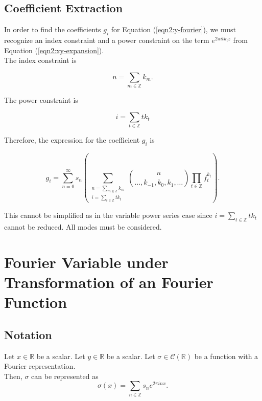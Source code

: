 \documentclass{article}
\begin{document}
    \subsection{Coefficient Extraction}

    In order to find the coefficients $g_i$ for Equation (\ref{eqn2:y-fourier}), we must recognize an index constraint and a power constraint on the term $e^{2\pi i t k_t z}$ from Equation (\ref{eqn2:xy-expansion}).\\

    The index constraint is

    \begin{equation}
        n = \sum_{m \in \mathbb{Z}} k_m.
    \end{equation}

    The power constraint is

    \begin{equation}
        i = \sum_{t \in \mathbb{Z}} tk_t
    \end{equation}

    Therefore, the expression for the coefficient $g_i$ is

    \begin{equation}
        g_i = \sum_{n=0}^{\infty} s_n \left(\sum_{\substack{n = \sum_{m \in \mathbb{Z}} k_m \\ i=\sum_{t \in \mathbb{Z}} tk_t}} \binom{n}{\ldots, k_{-1}, k_{0}, k_{1}, \dots} \prod_{t \in \mathbb{Z}}f_t^{k_t} \right).
    \end{equation}

    This cannot be simplified as in the variable power series case since $i = \sum_{t \in \mathbb{Z}} tk_t$ cannot be reduced. All modes must be considered.

    \section{Fourier Variable under Transformation of an Fourier Function}

    \subsection{Notation}
    Let $x \in \mathbb{R}$ be a scalar. Let $y \in \mathbb{R}$ be a scalar. Let $\sigma \in \mathcal{C}(\mathbb{R})$ be a function with a Fourier representation.\\

    Then, $\sigma$ can be represented as
    \begin{equation}
        \sigma(x) = \sum_{n \in \mathbb{Z}} s_n e^{2 \pi i n x}.
        \label{eqn3:sigma-fourier}
    \end{equation}
\end{document}
